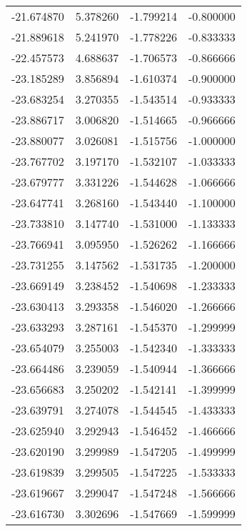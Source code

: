 \begin{tabular}{rrrr}
      -21.674870 &         5.378260 &   -1.799214 &  -0.800000 \\
      -21.889618 &         5.241970 &   -1.778226 &  -0.833333 \\
      -22.457573 &         4.688637 &   -1.706573 &  -0.866666 \\
      -23.185289 &         3.856894 &   -1.610374 &  -0.900000 \\
      -23.683254 &         3.270355 &   -1.543514 &  -0.933333 \\
      -23.886717 &         3.006820 &   -1.514665 &  -0.966666 \\
      -23.880077 &         3.026081 &   -1.515756 &  -1.000000 \\
      -23.767702 &         3.197170 &   -1.532107 &  -1.033333 \\
      -23.679777 &         3.331226 &   -1.544628 &  -1.066666 \\
      -23.647741 &         3.268160 &   -1.543440 &  -1.100000 \\
      -23.733810 &         3.147740 &   -1.531000 &  -1.133333 \\
      -23.766941 &         3.095950 &   -1.526262 &  -1.166666 \\
      -23.731255 &         3.147562 &   -1.531735 &  -1.200000 \\
      -23.669149 &         3.238452 &   -1.540698 &  -1.233333 \\
      -23.630413 &         3.293358 &   -1.546020 &  -1.266666 \\
      -23.633293 &         3.287161 &   -1.545370 &  -1.299999 \\
      -23.654079 &         3.255003 &   -1.542340 &  -1.333333 \\
      -23.664486 &         3.239059 &   -1.540944 &  -1.366666 \\
      -23.656683 &         3.250202 &   -1.542141 &  -1.399999 \\
      -23.639791 &         3.274078 &   -1.544545 &  -1.433333 \\
      -23.625940 &         3.292943 &   -1.546452 &  -1.466666 \\
      -23.620190 &         3.299989 &   -1.547205 &  -1.499999 \\
      -23.619839 &         3.299505 &   -1.547225 &  -1.533333 \\
      -23.619667 &         3.299047 &   -1.547248 &  -1.566666 \\
      -23.616730 &         3.302696 &   -1.547669 &  -1.599999 \\

\end{tabular}
